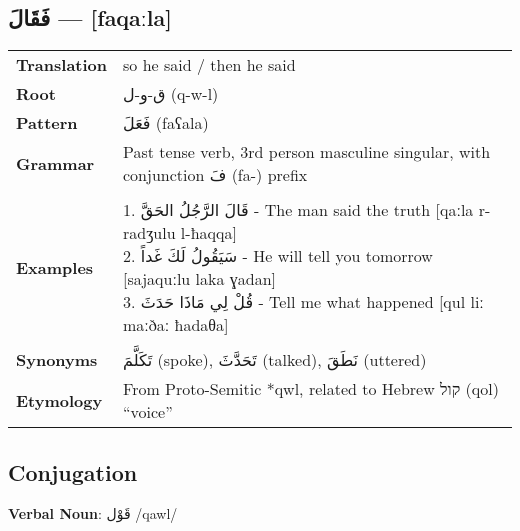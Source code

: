 \documentclass[letterpaper,12pt]{article}
\begin{document}
\subsection{\textarabic{فَقَالَ} — [faqaːla]}
\begin{tabular}{p{3cm}p{10cm}}
\toprule
\textbf{Translation} & so he said / then he said \\
\textbf{Root} & \textarabic{ق-و-ل} (q-w-l) \\
\textbf{Pattern} & \textarabic{فَعَلَ} (faʕala) \\
\textbf{Grammar} & Past tense verb, 3rd person masculine singular, with conjunction \textarabic{فَ} (fa-) prefix \\
\midrule \\
\textbf{Examples} & \makecell[l]{\parbox{9.5cm}{
1. \textarabic{قَالَ الرَّجُلُ الحَقَّ} - The man said the truth [qaːla r-radʒulu l-ħaqqa]\\
2. \textarabic{سَيَقُولُ لَكَ غَداً} - He will tell you tomorrow [sajaquːlu laka ɣadan]\\
3. \textarabic{قُلْ لِي مَاذَا حَدَثَ} - Tell me what happened [qul liː maːðaː ħadaθa]
} } \\
\midrule \\
\textbf{Synonyms} & \textarabic{تَكَلَّمَ} (spoke), \textarabic{تَحَدَّثَ} (talked), \textarabic{نَطَقَ} (uttered) \\
\textbf{Etymology} & From Proto-Semitic *qwl, related to Hebrew \texthebrew{קול} (qol) ``voice'' \\
\bottomrule
\end{tabular}

\subsection{Conjugation}
\par{ \large \textbf{Verbal Noun}: \textarabic{قَوْل} /qawl/}
\end{document}
